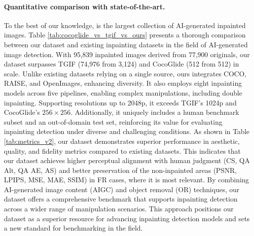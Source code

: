 \paragraph{Quantitative comparison with state-of-the-art.} 
To the best of our knowledge, \emph{\datasetname} is the largest collection of AI-generated inpainted images. Table \ref{tab:cocoglide_vs_tgif_vs_ours} presents a thorough comparison between our dataset and existing inpainting datasets in the field of AI-generated image detection.   With 95,839 inpainted images derived from 77,900 originals, our dataset surpasses TGIF (74,976 from 3,124) and CocoGlide (512 from 512) in scale. Unlike existing datasets relying on a single source, ours integrates COCO, RAISE, and OpenImages, enhancing diversity. It also employs eight inpainting models across five pipelines, enabling complex manipulations, including double inpainting. Supporting resolutions up to 2048p, it exceeds TGIF’s 1024p and CocoGlide’s $256 \times 256$. Additionally, it uniquely includes a human benchmark subset and an out-of-domain test set, reinforcing its value for evaluating inpainting detection under diverse and challenging conditions. As shown in Table \ref{tab:metrics_v2}, our dataset demonstrates superior performance in aesthetic, quality, and fidelity metrics compared to existing datasets. This indicates that our dataset achieves higher perceptual alignment with human judgment (CS, QA Alt, QA AE, AS) and better preservation of the non-inpainted areas (PSNR, LPIPS, MSE, MAE, SSIM) in FR cases, where it is most relevant. By combining AI-generated image content (AIGC) and object removal (OR) techniques, our dataset offers a comprehensive benchmark that supports inpainting detection across a wider range of manipulation scenarios. This approach positions our dataset as a superior resource for advancing inpainting detection models and sets a new standard for benchmarking in the field.




